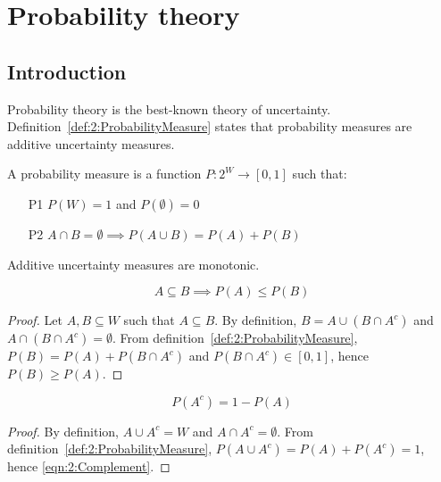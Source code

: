 \section{Probability theory}
\subsection{Introduction}

Probability theory is the best-known theory of uncertainty.
Definition~\ref{def:2:ProbabilityMeasure} states that probability measures are additive uncertainty measures.

\begin{dfn}
  \label{def:2:ProbabilityMeasure}

  A probability measure is a function $P : 2^W \rightarrow [0, 1]$ such that:
  \begin{enumerate}
    \item[P1] $P(W) = 1$ and $P(\emptyset) = 0$
    \item[P2] $A \cap B = \emptyset \implies P(A \cup B) = P(A) + P(B)$
  \end{enumerate}
\end{dfn}


Additive uncertainty measures are monotonic.

\begin{thm}[Monotonicity]
  \begin{equation}
    \label{eqn:2:Monotonicity}
    A \subseteq B \implies P(A) \leq P(B)
  \end{equation}
  \begin{proof}
    Let $A, B \subseteq W$ such that $A \subseteq B$.
    By definition, $B = A \cup(B \cap A^c)$ and $A \cap(B \cap A^c) = \emptyset$.
    From definition~\ref{def:2:ProbabilityMeasure},
    $P(B) = P(A) + P(B \cap A^c)$ and $P(B \cap A^c) \in [0, 1]$, hence $P(B) \geq P(A)$.
  \end{proof}
\end{thm}

\begin{thm}[Complement]
  \label{thm:2:Complement}
  \begin{equation}
    \label{eqn:2:Complement}
    P(A^c) = 1 - P(A)
  \end{equation}
  \begin{proof}
    By definition, $A \cup A^c = W$ and $A\cap A^c = \emptyset$.
    From definition~\ref{def:2:ProbabilityMeasure},
    $P(A \cup A^c) = P(A) + P(A^c) = 1$, hence \ref{eqn:2:Complement}.
  \end{proof}
\end{thm}

